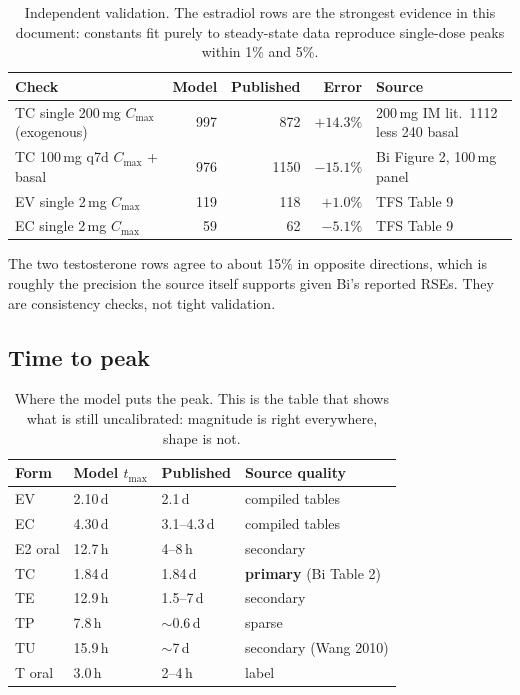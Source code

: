 \documentclass[11pt,a4paper]{article}
\newcommand{\bad}[1]{\textcolor{warn}{#1}}
\newcommand{\good}[1]{\textcolor{ok}{#1}}
\begin{document}
\begin{table}[h]
\centering
\small
\begin{tabular}{@{}lrrrl@{}}
\toprule
\textbf{Check} & \textbf{Model} & \textbf{Published} & \textbf{Error} & \textbf{Source} \\
\midrule
TC single 200\,mg $C_{\max}$ (exogenous) & 997 & 872 & $+14.3\%$
  & 200\,mg IM lit.\ 1112 less 240 basal \\
TC 100\,mg q7d $C_{\max}$ + basal & 976 & 1150 & $-15.1\%$
  & Bi Figure 2, 100\,mg panel \\
EV single 2\,mg $C_{\max}$ & 119 & 118 & \good{$+1.0\%$} & TFS Table 9 \\
EC single 2\,mg $C_{\max}$ & 59 & 62 & \good{$-5.1\%$} & TFS Table 9 \\
\bottomrule
\end{tabular}
\caption{Independent validation. The estradiol rows are the strongest evidence in
this document: constants fit purely to steady-state data reproduce single-dose
peaks within 1\% and 5\%.}
\end{table}

The two testosterone rows agree to about 15\% in opposite directions, which is
roughly the precision the source itself supports given Bi's reported RSEs. They
are consistency checks, not tight validation.

\subsection{Time to peak}

\begin{table}[h]
\centering
\small
\begin{tabular}{@{}llll@{}}
\toprule
\textbf{Form} & \textbf{Model $t_{\max}$} & \textbf{Published} & \textbf{Source quality} \\
\midrule
EV      & 2.10\,d & 2.1\,d & compiled tables \\
EC      & 4.30\,d & 3.1--4.3\,d & compiled tables \\
E2 oral & \bad{12.7\,h} & \bad{4--8\,h} & secondary \\
TC      & \good{1.84\,d} & \good{1.84\,d} & \textbf{primary} (Bi Table 2) \\
TE      & \bad{12.9\,h} & \bad{1.5--7\,d} & secondary \\
TP      & \bad{7.8\,h} & \bad{$\sim$0.6\,d} & sparse \\
TU      & \bad{15.9\,h} & \bad{$\sim$7\,d} & secondary (Wang 2010) \\
T oral  & \good{3.0\,h} & \good{2--4\,h} & label \\
\bottomrule
\end{tabular}
\caption{Where the model puts the peak. This is the table that shows what is still
uncalibrated: magnitude is right everywhere, shape is not.}
\label{tab:tmax}
\end{table}
\end{document}
